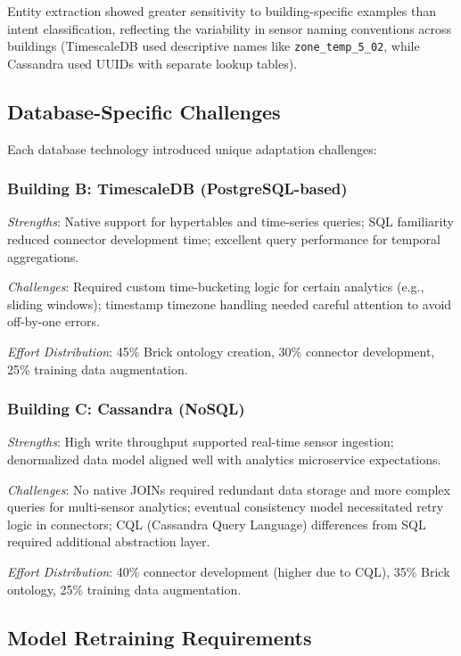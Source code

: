\documentclass[acmlarge]{acmart}
\begin{document}
Entity extraction showed greater sensitivity to building-specific examples than intent classification, reflecting the variability in sensor naming conventions across buildings (TimescaleDB used descriptive names like \texttt{zone\_temp\_5\_02}, while Cassandra used UUIDs with separate lookup tables).

\subsection{Database-Specific Challenges}

Each database technology introduced unique adaptation challenges:

\subsubsection{Building B: TimescaleDB (PostgreSQL-based)}

\textit{Strengths}: Native support for hypertables and time-series queries; SQL familiarity reduced connector development time; excellent query performance for temporal aggregations.

\textit{Challenges}: Required custom time-bucketing logic for certain analytics (e.g., sliding windows); timestamp timezone handling needed careful attention to avoid off-by-one errors.

\textit{Effort Distribution}: 45\% Brick ontology creation, 30\% connector development, 25\% training data augmentation.

\subsubsection{Building C: Cassandra (NoSQL)}

\textit{Strengths}: High write throughput supported real-time sensor ingestion; denormalized data model aligned well with analytics microservice expectations.

\textit{Challenges}: No native JOINs required redundant data storage and more complex queries for multi-sensor analytics; eventual consistency model necessitated retry logic in connectors; CQL (Cassandra Query Language) differences from SQL required additional abstraction layer.

\textit{Effort Distribution}: 40\% connector development (higher due to CQL), 35\% Brick ontology, 25\% training data augmentation.

\subsection{Model Retraining Requirements}
\end{document}
